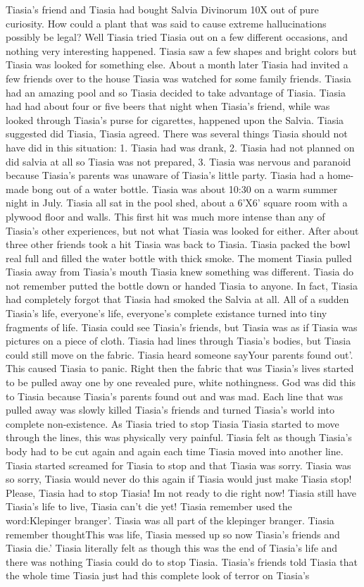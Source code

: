 \documentclass[12pt]{book}
\begin{document}
Tiasia's friend and Tiasia had bought Salvia Divinorum 10X out of pure curiosity. How could a plant that was said to cause extreme hallucinations possibly be legal? Well Tiasia tried Tiasia out on a few different occasions, and nothing very interesting happened. Tiasia saw a few shapes and bright colors but Tiasia was looked for something else. About a month later Tiasia had invited a few friends over to the house Tiasia was watched for some family friends. Tiasia had an amazing pool and so Tiasia decided to take advantage of Tiasia. Tiasia had had about four or five beers that night when Tiasia's friend, while was looked through Tiasia's purse for cigarettes, happened upon the Salvia. Tiasia suggested did Tiasia, Tiasia agreed. There was several things Tiasia should not have did in this situation: 1. Tiasia had was drank, 2. Tiasia had not planned on did salvia at all so Tiasia was not prepared, 3. Tiasia was nervous and paranoid because Tiasia's parents was unaware of Tiasia's little party. Tiasia had a home-made bong out of a water bottle. Tiasia was about 10:30 on a warm summer night in July. Tiasia all sat in the pool shed, about a 6'X6' square room with a plywood floor and walls. This first hit was much more intense than any of Tiasia's other experiences, but not what Tiasia was looked for either. After about three other friends took a hit Tiasia was back to Tiasia. Tiasia packed the bowl real full and filled the water bottle with thick smoke. The moment Tiasia pulled Tiasia away from Tiasia's mouth Tiasia knew something was different. Tiasia do not remember putted the bottle down or handed Tiasia to anyone. In fact, Tiasia had completely forgot that Tiasia had smoked the Salvia at all. All of a sudden Tiasia's life, everyone's life, everyone's complete existance turned into tiny fragments of life. Tiasia could see Tiasia's friends, but Tiasia was as if Tiasia was pictures on a piece of cloth. Tiasia had lines through Tiasia's bodies, but Tiasia could still move on the fabric. Tiasia heard someone sayYour parents found out'. This caused Tiasia to panic. Right then the fabric that was Tiasia's lives started to be pulled away one by one revealed pure, white nothingness. God was did this to Tiasia because Tiasia's parents found out and was mad. Each line that was pulled away was slowly killed Tiasia's friends and turned Tiasia's world into complete non-existence. As Tiasia tried to stop Tiasia Tiasia started to move through the lines, this was physically very painful. Tiasia felt as though Tiasia's body had to be cut again and again each time Tiasia moved into another line. Tiasia started screamed for Tiasia to stop and that Tiasia was sorry. Tiasia was so sorry, Tiasia would never do this again if Tiasia would just make Tiasia stop! Please, Tiasia had to stop Tiasia! Im not ready to die right now! Tiasia still have Tiasia's life to live, Tiasia can't die yet! Tiasia remember used the word:Klepinger branger'. Tiasia was all part of the klepinger branger. Tiasia remember thoughtThis was life, Tiasia messed up so now Tiasia's friends and Tiasia die.' Tiasia literally felt as though this was the end of Tiasia's life and there was nothing Tiasia could do to stop Tiasia. Tiasia's friends told Tiasia that the whole time Tiasia just had this complete look of terror on Tiasia's 
\end{document}
